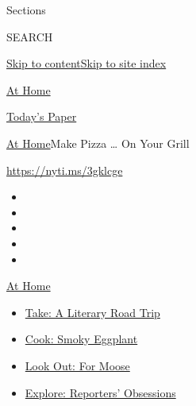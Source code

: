 Sections

SEARCH

\protect\hyperlink{site-content}{Skip to
content}\protect\hyperlink{site-index}{Skip to site index}

\href{https://www.nytimes3xbfgragh.onion/spotlight/at-home}{At Home}

\href{https://myaccount.nytimes3xbfgragh.onion/auth/login?response_type=cookie\&client_id=vi}{}

\href{https://www.nytimes3xbfgragh.onion/section/todayspaper}{Today's
Paper}

\href{/spotlight/at-home}{At Home}\textbar{}Make Pizza \ldots{} On Your
Grill

\url{https://nyti.ms/3gklcge}

\begin{itemize}
\item
\item
\item
\item
\item
\end{itemize}

\href{https://www.nytimes3xbfgragh.onion/spotlight/at-home?action=click\&pgtype=Article\&state=default\&region=TOP_BANNER\&context=at_home_menu}{At
Home}

\begin{itemize}
\tightlist
\item
  \href{https://www.nytimes3xbfgragh.onion/2020/07/28/books/time-for-a-literary-road-trip.html?action=click\&pgtype=Article\&state=default\&region=TOP_BANNER\&context=at_home_menu}{Take:
  A Literary Road Trip}
\item
  \href{https://www.nytimes3xbfgragh.onion/2020/07/29/magazine/bored-with-your-home-cooking-some-smoky-eggplant-will-fix-that.html?action=click\&pgtype=Article\&state=default\&region=TOP_BANNER\&context=at_home_menu}{Cook:
  Smoky Eggplant}
\item
  \href{https://www.nytimes3xbfgragh.onion/2020/07/27/travel/moose-michigan-isle-royale.html?action=click\&pgtype=Article\&state=default\&region=TOP_BANNER\&context=at_home_menu}{Look
  Out: For Moose}
\item
  \href{https://www.nytimes3xbfgragh.onion/interactive/2020/at-home/even-more-reporters-editors-diaries-lists-recommendations.html?action=click\&pgtype=Article\&state=default\&region=TOP_BANNER\&context=at_home_menu}{Explore:
  Reporters' Obsessions}
\end{itemize}


